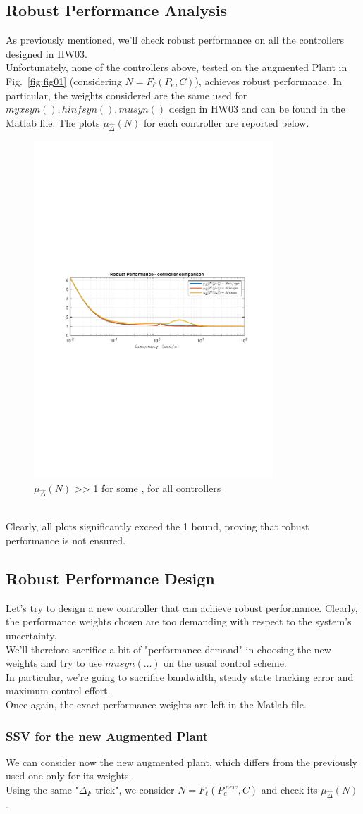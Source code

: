 \documentclass[a4paper, 12pt]{article}
\def\FigureTwo{\centering\includegraphics[width=0.8\textwidth]{Figures/fig02.pdf}}
\begin{document}
\subsection{Robust Performance Analysis}
As previously mentioned, we'll check robust performance on all the controllers designed in HW03.
\\
Unfortunately, none of the controllers above, tested on the augmented Plant in Fig.~\ref{fig:fig01} (considering $N = F_\ell (P_e,C)$), achieves robust performance. In particular, the weights considered are the same used for $myxsyn(),hinfsyn(),musyn()$ design in HW03 and can be found in the Matlab file.
The plots $\mu_{\hat{\Delta}}(N)$ for each controller are reported below.
\begin{figure}[h!]
    \FigureTwo
    \caption{$\mu_{\hat{\Delta}}(N)$ >> 1 for some \omega, for all controllers}
    \label{fig:fig11}
\end{figure}
\\Clearly, all plots significantly exceed the 1 bound, proving that robust performance is not ensured.
\subsection{Robust Performance Design}
Let's try to design a new controller that can achieve robust performance. Clearly, the performance weights chosen are too demanding with respect to the system's uncertainty.\\
We'll therefore sacrifice a bit of "performance demand" in choosing the new weights and try to use $musyn(\dots)$ on the usual control scheme. 
\\ In particular, we're going to sacrifice bandwidth, steady state tracking error and maximum control effort. \\Once again, the exact performance weights are left in the Matlab file.
\subsubsection{SSV for the new Augmented Plant}
We can consider now the new augmented plant, which differs from the previously used one only for its weights.
\\
Using the same "$\Delta_F$ trick", we consider $N = F_\ell (P_e^{\ new},C)$ and check its $\mu_{\hat{\Delta}}(N)$.
\end{document}
